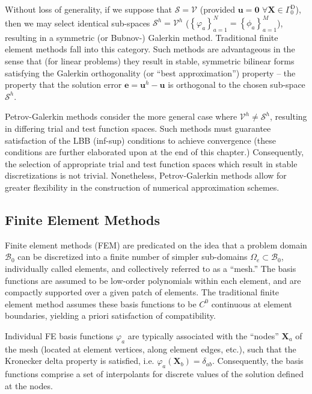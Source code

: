 Without loss of generality, if we suppose that $\mathcal{S} = \mathcal{V}$ (provided $\bm{u} = \bm{0} \, \, \forall \bm{X} \in \Gamma^{\mathrm D}_0$), then we may select identical sub-spaces $\mathcal{S}^h = \mathcal{V}^h$ ($\left\{ \varphi_a \right\}_{a = 1}^{N} = \left\{ \phi_a \right\}_{a = 1}^{M}$), resulting in a symmetric (or Bubnov-) Galerkin method. Traditional finite element methods fall into this category. Such methods are advantageous in the sense that (for linear problems) they result in stable, symmetric bilinear forms satisfying the Galerkin orthogonality (or ``best approximation'') property -- the property that the solution error $\bm{e} = \bm{u}^h - \bm{u}$ is orthogonal to the chosen sub-space $\mathcal{S}^h$.

Petrov-Galerkin methods consider the more general case where $\mathcal{V}^h \neq \mathcal{S}^h$, resulting in differing trial and test function spaces. Such methods must guarantee satisfaction of the LBB (inf-sup) conditions to achieve convergence (these conditions are further elaborated upon at the end of this chapter.) Consequently, the selection of appropriate trial and test function spaces which result in stable discretizations is not trivial. Nonetheless, Petrov-Galerkin methods allow for greater flexibility in the construction of numerical approximation schemes.

\subsection*{Finite Element Methods}

Finite element methods (FEM) are predicated on the idea that a problem domain $\mathcal{B}_0$ can be discretized into a finite number of simpler sub-domains $\Omega_e \subset \mathcal{B}_0$, individually called elements, and collectively referred to as a ``mesh.'' The basis functions are assumed to be low-order polynomials within each element, and are compactly supported over a given patch of elements. The traditional finite element method assumes these basis functions to be $C^0$ continuous at element boundaries, yielding a priori satisfaction of compatibility.

Individual FE basis functions $\varphi_a$ are typically associated with the ``nodes'' $\bm{X}_a$ of the mesh (located at element vertices, along element edges, etc.), such that the Kronecker delta property is satisfied, i.e. $\varphi_a (\bm{X}_b) = \delta_{ab}$. Consequently, the basis functions comprise a set of interpolants for discrete values of the solution defined at the nodes.


